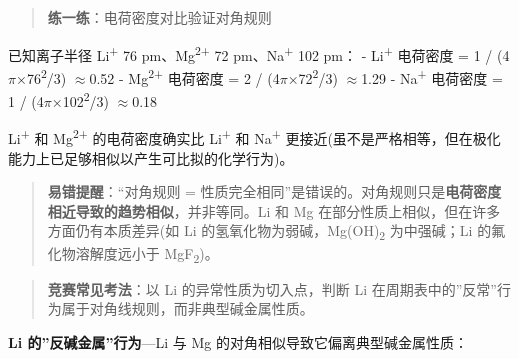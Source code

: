 \documentclass[a4paper,11pt]{ctexart}
\newcommand{\箭}{\ensuremath{\rightarrow}}
\newcommand{\左箭}{\ensuremath{\leftarrow}}
\newcommand{\上箭}{\ensuremath{\uparrow}}
\newcommand{\下箭}{\ensuremath{\downarrow}}
\newcommand{\衡}{\ensuremath{\rightleftharpoons}}
\newcommand{\双箭}{\ensuremath{\leftrightarrow}}
\newcommand{\约等于}{\ensuremath{\approx}}
\newcommand{\小于等于}{\ensuremath{\leq}}
\newcommand{\大于等于}{\ensuremath{\geq}}
\newcommand{\不等于}{\ensuremath{\neq}}
\newcommand{\西格马}{\ensuremath{\sigma}}
\newcommand{\派}{\ensuremath{\pi}}
\begin{document}
\begin{quote}
\textbf{练一练}：电荷密度对比验证对角规则
\end{quote}

已知离子半径 Li\textsuperscript{+} 76 pm、Mg\textsuperscript{2+} 72 pm、Na\textsuperscript{+} 102 pm：
- Li\textsuperscript{+} 电荷密度 = 1 / (4\派×76\textsuperscript{2}/3) \约等于 0.52
- Mg\textsuperscript{2+} 电荷密度 = 2 / (4\派×72\textsuperscript{2}/3) \约等于 1.29
- Na\textsuperscript{+} 电荷密度 = 1 / (4\派×102\textsuperscript{2}/3) \约等于 0.18

Li\textsuperscript{+} 和 Mg\textsuperscript{2+} 的电荷密度确实比 Li\textsuperscript{+} 和 Na\textsuperscript{+} 更接近(虽不是严格相等，但在极化能力上已足够相似以产生可比拟的化学行为)。

\begin{quote}
\textbf{易错提醒}：``对角规则 = 性质完全相同''是错误的。对角规则只是\textbf{电荷密度相近导致的趋势相似}，并非等同。Li 和 Mg 在部分性质上相似，但在许多方面仍有本质差异(如 Li 的氢氧化物为弱碱，Mg(OH)\textsubscript{2} 为中强碱；Li 的氟化物溶解度远小于 MgF\textsubscript{2})。
\end{quote}

\begin{quote}
\textbf{竞赛常见考法}：以 Li 的异常性质为切入点，判断 Li 在周期表中的''反常''行为属于对角线规则，而非典型碱金属性质。
\end{quote}

\textbf{Li 的''反碱金属''行为}---Li 与 Mg 的对角相似导致它偏离典型碱金属性质：
\end{document}
